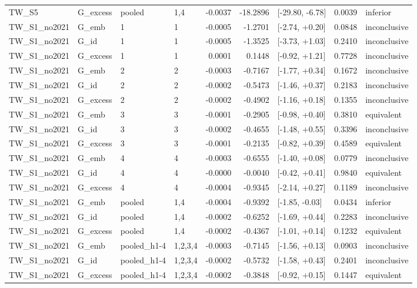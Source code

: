\begin{tabular}{llllrrlrl}
TW\_S5 & G\_excess & pooled & 1,4 & -0.0037 & -18.2896 & [-29.80, -6.78] & 0.0039 & inferior \\
TW\_S1\_no2021 & G\_emb & 1 & 1 & -0.0005 & -1.2701 & [-2.74, +0.20] & 0.0848 & inconclusive \\
TW\_S1\_no2021 & G\_id & 1 & 1 & -0.0005 & -1.3525 & [-3.73, +1.03] & 0.2410 & inconclusive \\
TW\_S1\_no2021 & G\_excess & 1 & 1 & 0.0001 & 0.1448 & [-0.92, +1.21] & 0.7728 & inconclusive \\
TW\_S1\_no2021 & G\_emb & 2 & 2 & -0.0003 & -0.7167 & [-1.77, +0.34] & 0.1672 & inconclusive \\
TW\_S1\_no2021 & G\_id & 2 & 2 & -0.0002 & -0.5473 & [-1.46, +0.37] & 0.2183 & inconclusive \\
TW\_S1\_no2021 & G\_excess & 2 & 2 & -0.0002 & -0.4902 & [-1.16, +0.18] & 0.1355 & inconclusive \\
TW\_S1\_no2021 & G\_emb & 3 & 3 & -0.0001 & -0.2905 & [-0.98, +0.40] & 0.3810 & equivalent \\
TW\_S1\_no2021 & G\_id & 3 & 3 & -0.0002 & -0.4655 & [-1.48, +0.55] & 0.3396 & inconclusive \\
TW\_S1\_no2021 & G\_excess & 3 & 3 & -0.0001 & -0.2135 & [-0.82, +0.39] & 0.4589 & equivalent \\
TW\_S1\_no2021 & G\_emb & 4 & 4 & -0.0003 & -0.6555 & [-1.40, +0.08] & 0.0779 & inconclusive \\
TW\_S1\_no2021 & G\_id & 4 & 4 & -0.0000 & -0.0040 & [-0.42, +0.41] & 0.9840 & equivalent \\
TW\_S1\_no2021 & G\_excess & 4 & 4 & -0.0004 & -0.9345 & [-2.14, +0.27] & 0.1189 & inconclusive \\
TW\_S1\_no2021 & G\_emb & pooled & 1,4 & -0.0004 & -0.9392 & [-1.85, -0.03] & 0.0434 & inferior \\
TW\_S1\_no2021 & G\_id & pooled & 1,4 & -0.0002 & -0.6252 & [-1.69, +0.44] & 0.2283 & inconclusive \\
TW\_S1\_no2021 & G\_excess & pooled & 1,4 & -0.0002 & -0.4367 & [-1.01, +0.14] & 0.1232 & equivalent \\
TW\_S1\_no2021 & G\_emb & pooled\_h1-4 & 1,2,3,4 & -0.0003 & -0.7145 & [-1.56, +0.13] & 0.0903 & inconclusive \\
TW\_S1\_no2021 & G\_id & pooled\_h1-4 & 1,2,3,4 & -0.0002 & -0.5732 & [-1.58, +0.43] & 0.2401 & inconclusive \\
TW\_S1\_no2021 & G\_excess & pooled\_h1-4 & 1,2,3,4 & -0.0002 & -0.3848 & [-0.92, +0.15] & 0.1447 & equivalent \\

\end{tabular}
